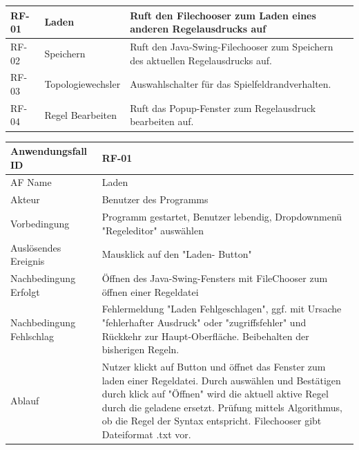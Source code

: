 \documentclass[11pt,a4paper]{article}
\begin{document}
\begin{longtable}[m]{|m{2cm}|m{4cm}|m{9cm}|} %
		\hline
		RF-01 & Laden & Ruft den Filechooser zum Laden eines anderen Regelausdrucks auf \\
		\hline
		RF-02 & Speichern & Ruft den Java-Swing-Filechooser zum Speichern des aktuellen Regelausdrucks auf. \\
		\hline
		RF-03 & Topologiewechsler & Auswahlschalter für das Spielfeldrandverhalten. \\
		\hline
		RF-04 & Regel Bearbeiten & Ruft das Popup-Fenster zum Regelausdruck bearbeiten auf. \\
		\hline
\end{longtable}
\pagebreak


     \begin{tabular}[m]{|m{7cm}|m{9cm}|}
          \hline
          Anwendungsfall ID     & RF-01 \\ %
          \hline
          AF Name     &  Laden \\
          \hline
          Akteur&Benutzer des Programms \\
          \hline
          Vorbedingung&Programm gestartet, Benutzer lebendig, Dropdownmenü "Regeleditor" auswählen\\
          \hline
          Auslösendes Ereignis&Mausklick auf den "Laden- Button"\\
          \hline
          Nachbedingung Erfolgt&Öffnen des Java-Swing-Fensters mit FileChooser zum öffnen einer Regeldatei\\
          \hline
          Nachbedingung Fehlschlag&Fehlermeldung "Laden Fehlgeschlagen", ggf. mit Ursache "fehlerhafter Ausdruck" oder "zugriffsfehler" und Rückkehr zur Haupt-Oberfläche. Beibehalten der bisherigen Regeln.\\
          \hline
          Ablauf&Nutzer klickt auf Button und öffnet das Fenster zum laden einer Regeldatei. Durch auswählen und Bestätigen durch klick auf "Öffnen" wird die aktuell aktive Regel durch die geladene ersetzt.
          Prüfung mittels Algorithmus, ob die Regel der Syntax entspricht. Filechooser gibt Dateiformat .txt vor.\\
          \hline
     \end{tabular}
     \par
     
\end{document}
